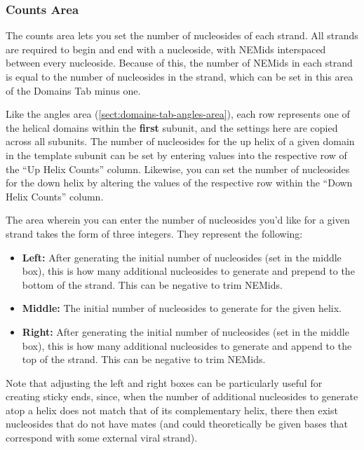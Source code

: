 \documentclass[titlepage]{article}
\begin{document}
\subsubsection{Counts Area} \label{sect:domains-tab-counts-area}

The counts area lets you set the number of nucleosides of each strand. All strands are required to begin and end with a nucleoside, with NEMids interspaced between every nucleoside. Because of this, the number of NEMids in each strand is equal to the number of nucleosides in the strand, which can be set in this area of the Domains Tab minus one. 

Like the angles area (\ref{sect:domains-tab-angles-area}), each row represents one of the helical domains within the \textbf{first} subunit, and the settings here are copied across all subunits. The number of nucleosides for the up helix of a given domain in the template subunit can be set by entering values into the respective row of the ``Up Helix Counts'' column. Likewise, you can set the number of nucleosides for the down helix by altering the values of the respective row within the ``Down Helix Counts'' column.

The area wherein you can enter the number of nucleosides you'd like for a given strand takes the form of three integers. They represent the following:

\begin{itemize}
	\item \textbf{Left:} After generating the initial number of nucleosides (set in the middle box), this is how many additional nucleosides to generate and prepend to the bottom of the strand. This can be negative to trim NEMids.
	
	\item \textbf{Middle:} The initial number of nucleosides to generate for the given helix.
	
	\item \textbf{Right:} After generating the initial number of nucleosides (set in the middle box), this is how many additional nucleosides to generate and append to the top of the strand. This can be negative to trim NEMids.
\end{itemize}

Note that adjusting the left and right boxes can be particularly useful for creating sticky ends, since, when the number of additional nucleosides to generate atop a helix does not match that of its complementary helix, there then exist nucleosides that do not have mates (and could theoretically be given bases that correspond with some external viral strand).
\end{document}
